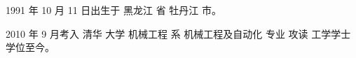 \begin{resume}

	
	1991 年 10 月 11 日出生于 黑龙江 省 牡丹江 市。
	
	2010 年 9 月考入 清华 大学 机械工程 系 机械工程及自动化 专业 攻读 工学学士 学位至今。
	
	\begin{comment}
		\resumeitem{发表的学术论文} %
	
		\begin{enumerate}[{[}1{]}]
		\end{enumerate}

		\resumeitem{研究成果} %
		\begin{enumerate}[{[}1{]}]
		\item 任天令, 杨轶, 朱一平, 等. 硅基铁电微声学传感器畴极化区域控制和电极连接的
		方法: 中国, CN1602118A. (中国专利公开号.)
		\item Ren T L, Yang Y, Zhu Y P, et al. Piezoelectric micro acoustic sensor
		based on ferroelectric materials: USA, No.11/215, 102. (美国发明专利申请号.)
		\end{enumerate}
	\end{comment}
\end{resume}
